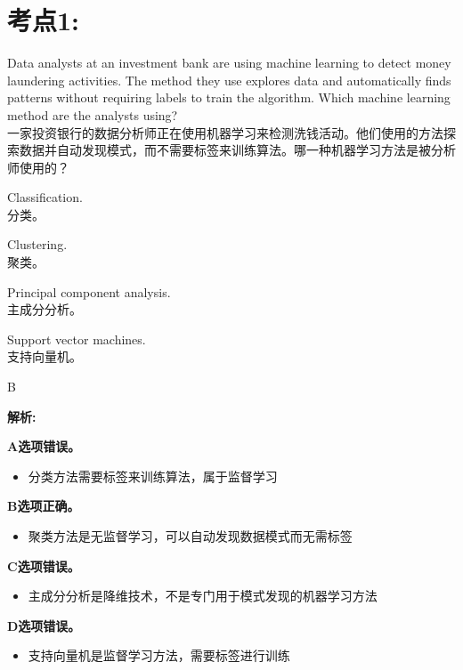 \documentclass{article}
\newcounter{question} %
\newenvironment{explanation}
{\textbf{解析:}\par}
{\par}
\begin{document}
 \tableofcontents %
\newpage




\section{考点1:}
\setcounter{question}{0}


\begin{question}
    Data analysts at an investment bank are using machine learning to detect money laundering activities. The method they use explores data and automatically finds patterns without requiring labels to train the algorithm. Which machine learning method are the analysts using?\\
    一家投资银行的数据分析师正在使用机器学习来检测洗钱活动。他们使用的方法探索数据并自动发现模式，而不需要标签来训练算法。哪一种机器学习方法是被分析师使用的？
\end{question}

\begin{choices}
    \item Classification.\\分类。
    \item Clustering.\\聚类。
    \item Principal component analysis.\\主成分分析。
    \item Support vector machines.\\支持向量机。
\end{choices}

\begin{correctanswer}
    B
\end{correctanswer}

\begin{explanation}
    \textbf{A选项错误。}
    \begin{itemize}
        \item 分类方法需要标签来训练算法，属于监督学习
    \end{itemize}
    
    \textbf{B选项正确。}
    \begin{itemize}
        \item 聚类方法是无监督学习，可以自动发现数据模式而无需标签
    \end{itemize}
    
    \textbf{C选项错误。}
    \begin{itemize}
        \item 主成分分析是降维技术，不是专门用于模式发现的机器学习方法
    \end{itemize}
    
    \textbf{D选项错误。}
    \begin{itemize}
        \item 支持向量机是监督学习方法，需要标签进行训练
    \end{itemize}
\end{explanation}
\end{document}
